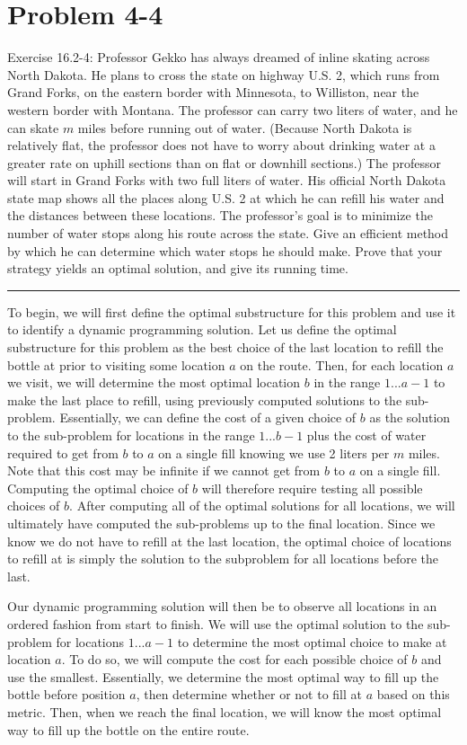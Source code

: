 \documentclass[11pt]{article}
\def\separateline{\medskip\hrule\medskip}
\begin{document}
\newpage

\section{Problem 4-4}
Exercise 16.2-4: Professor Gekko has always dreamed of inline skating across North Dakota. He plans to cross the state on highway U.S. 2, which runs from Grand Forks, on the eastern border with Minnesota, to Williston, near the western border with Montana. The professor can carry two liters of water, and he can skate $m$ miles before running out of water. (Because North Dakota is relatively flat, the professor does not have to worry about drinking water at a greater rate on uphill sections than on flat or downhill sections.) The professor will start in Grand Forks with two full liters of water. His official North Dakota state map shows all the places along U.S. 2 at which he can refill his water and the distances between these locations. The professor’s goal is to minimize the number of water stops along his route across the state. Give an efficient method by which he can determine which water stops he should make. Prove that your strategy yields an optimal solution, and give its running time.
\separateline

To begin, we will first define the optimal substructure for this problem and use it to identify a dynamic programming solution. Let us define the optimal substructure for this problem as the best choice of the last location to refill the bottle at prior to visiting some location $a$ on the route. Then, for each location $a$ we visit, we will determine the most optimal location $b$ in the range $1...a-1$ to make the last place to refill, using previously computed solutions to the sub-problem. Essentially, we can define the cost of a given choice of $b$ as the solution to the sub-problem for locations in the range $1...b-1$ plus the cost of water required to get from $b$ to $a$ on a single fill knowing we use 2 liters per $m$ miles. Note that this cost may be infinite if we cannot get from $b$ to $a$ on a single fill. Computing the optimal choice of $b$ will therefore require testing all possible choices of $b$. After computing all of the optimal solutions for all locations, we will ultimately have computed the sub-problems up to the final location. Since we know we do not have to refill at the last location, the optimal choice of locations to refill at is simply the solution to the subproblem for all locations before the last.

Our dynamic programming solution will then be to observe all locations in an ordered fashion from start to finish. We will use the optimal solution to the sub-problem for locations $1...a-1$ to determine the most optimal choice to make at location $a$. To do so, we will compute the cost for each possible choice of $b$ and use the smallest. Essentially, we determine the most optimal way to fill up the bottle before position $a$, then determine whether or not to fill at $a$ based on this metric. Then, when we reach the final location, we will know the most optimal way to fill up the bottle on the entire route.
\end{document}
